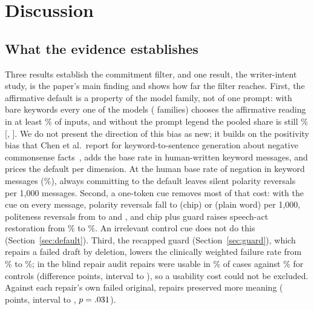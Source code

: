 \section{Discussion}\label{sec:discussion}

\subsection{What the evidence establishes}\label{sec:disc-summary}

Three results establish the commitment filter, and one result, the writer-intent study, is the paper's main finding and shows how far the filter reaches.
First, the affirmative default is a property of the model family, not of one prompt: with bare keywords every one of the \jmbreadthModels{} models (\jmbreadthFamilies{} families) chooses the affirmative reading in at least \jmbreadthMinAff{}\% of inputs, and without the prompt legend the pooled share is still \jmlegendNoLegendAff{}\% [\jmlegendNoLegendAffLo{}, \jmlegendNoLegendAffHi{}].
We do not present the direction of this bias as new; it builds on the positivity bias that Chen et al.\ report for keyword-to-sentence generation about negative commonsense facts~\cite{chen2023say}, adds the base rate in human-written keyword messages, and prices the default per dimension.
At the human base rate of negation in keyword messages (\jmtTwoNegBase{}\%), always committing to the default leaves \jmfOneRevPolBare{} silent polarity reversals per 1,000 messages.
Second, a one-token cue removes most of that cost: with the cue on every message, polarity reversals fall to \jmfOneRevPolChip{} (chip) or \jmfOneRevPolWord{} (plain word) per 1,000, politeness reversals from \jmfOneRevPoliteBare{} to \jmfOneRevPoliteChip{} and \jmfOneRevPoliteWord{}, and chip plus guard raises speech-act restoration from \jmfOneActRestoreChip{}\% to \jmfOneActRestoreChipG{}\%.
An irrelevant control cue does not do this (Section~\ref{sec:default}).
Third, the recapped guard (Section~\ref{sec:guard}), which repairs a failed draft by deletion, lowers the clinically weighted failure rate from \jmslpWGuardBase{}\% to \jmslpWGuardG{}\%; in the blind repair audit repairs were usable in \jmpOneSevenRepUsable{}\% of cases against \jmpOneSevenCtlUsable{}\% for controls (difference \jmpOneSevenDiffUsable{} points, interval \jmpOneSevenDiffUsableLo{} to \jmpOneSevenDiffUsableHi{}), so a usability cost could not be excluded.
Against each repair's own failed original, repairs preserved more meaning (\jmpOneSevenOrigPres{} points, interval \jmpOneSevenOrigPresLo{} to \jmpOneSevenOrigPresHi{}, $p=.031{}$).

